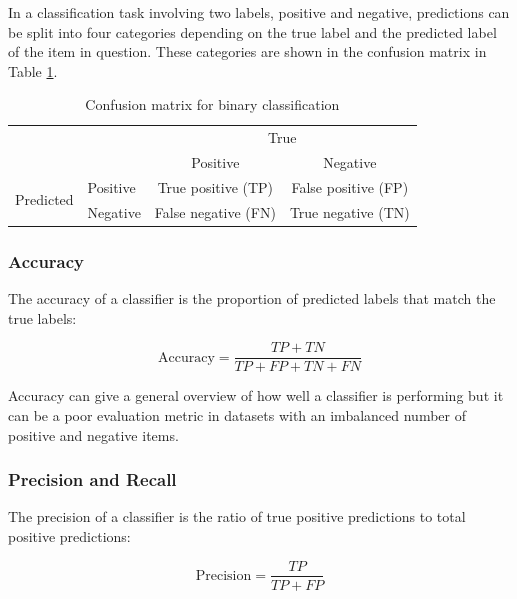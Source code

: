 In a classification task involving two labels, positive and negative, predictions can be split into four categories depending on the true label and the predicted label of the item in question. These categories are shown in the confusion matrix in Table \ref{tab:Explain_ConfMat}.

\renewcommand\arraystretch{1.5}
\begin{table}[ht]
    \centering
    \begin{tabular}{l|l|c|c|}
        \multicolumn{2}{c}{} & \multicolumn{2}{c}{True}\\
        \cline{3-4}
        \multicolumn{2}{c|}{} & Positive & Negative\\
        \cline{2-4}
        \multirow{2}{*}{Predicted}& Positive & True positive (TP) & False positive (FP)\\
        \cline{2-4}
        & Negative & False negative (FN) & True negative (TN)\\
        \cline{2-4}
    \end{tabular}
    \caption{Confusion matrix for binary classification}
    \label{tab:Explain_ConfMat}
\end{table}
\renewcommand\arraystretch{1}

\subsubsection{Accuracy}

The accuracy of a classifier is the proportion of predicted labels that match the true labels:

\begin{equation*}
    \mathrm{Accuracy} = \frac{TP + TN}{TP + FP + TN + FN}
\end{equation*}

Accuracy can give a general overview of how well a classifier is performing but it can be a poor evaluation metric in datasets with an imbalanced number of positive and negative items.

\subsubsection{Precision and Recall}

The precision of a classifier is the ratio of true positive predictions to total positive predictions:

\begin{equation*}
    \mathrm{Precision} = \frac{TP}{TP + FP}
\end{equation*}

